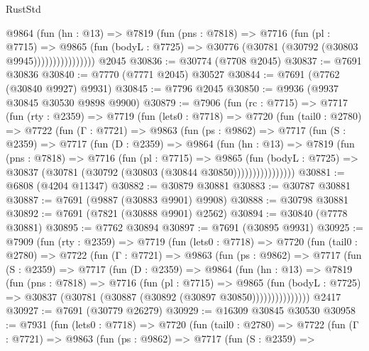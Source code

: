 \begin{lexlean}{RustStd}
\begin{coremodule}
                    @9864
                      (fun (hn : @13) =>
                      @7819
                        (fun (pns : @7818) =>
                        @7716
                          (fun (pl : @7715) =>
                          @9865
                            (fun (bodyL : @7725) =>
                            @30776 (@30781 (@30792 (@30803 @9945))))))))))))))))
    @2045
@30836 := @30774 (@7708 @2045)
@30837 := @7691 @30836
@30840 := @7770 (@7771 @2045) @30527
@30844 := @7691 (@7762 (@30840 @9927) @9931)
@30845 := @7796 @2045
@30850 := @9936 (@9937 @30845 @30530 @9898 @9900)
@30879 := @7906
    (fun (rc : @7715) =>
    @7717
      (fun (rty : @2359) =>
      @7719
        (fun (lets0 : @7718) =>
        @7720
          (fun (tail0 : @2780) =>
          @7722
            (fun (Γ : @7721) =>
            @9863
              (fun (ps : @9862) =>
              @7717
                (fun (S : @2359) =>
                @7717
                  (fun (D : @2359) =>
                  @9864
                    (fun (hn : @13) =>
                    @7819
                      (fun (pns : @7818) =>
                      @7716
                        (fun (pl : @7715) =>
                        @9865
                          (fun (bodyL : @7725) =>
                          @30837 (@30781 (@30792 (@30803 (@30844 @30850))))))))))))))))
@30881 := @6808 (@4204 @11347)
@30882 := @30879 @30881
@30883 := @30787 @30881
@30887 := @7691 (@9887 (@30883 @9901) @9908)
@30888 := @30798 @30881
@30892 := @7691 (@7821 (@30888 @9901) @2562)
@30894 := @30840 (@7778 @30881)
@30895 := @7762 @30894
@30897 := @7691 (@30895 @9931)
@30925 := @7909
    (fun (rty : @2359) =>
    @7719
      (fun (lets0 : @7718) =>
      @7720
        (fun (tail0 : @2780) =>
        @7722
          (fun (Γ : @7721) =>
          @9863
            (fun (ps : @9862) =>
            @7717
              (fun (S : @2359) =>
              @7717
                (fun (D : @2359) =>
                @9864
                  (fun (hn : @13) =>
                  @7819
                    (fun (pns : @7818) =>
                    @7716
                      (fun (pl : @7715) =>
                      @9865
                        (fun (bodyL : @7725) =>
                        @30837 (@30781 (@30887 (@30892 (@30897 @30850)))))))))))))))
    @2417
@30927 := @7691 (@30779 @26279)
@30929 := @16309 @30845 @30530
@30958 := @7931
    (fun (lets0 : @7718) =>
    @7720
      (fun (tail0 : @2780) =>
      @7722
        (fun (Γ : @7721) =>
        @9863
          (fun (ps : @9862) =>
          @7717
            (fun (S : @2359) =>

\end{coremodule}
\end{lexlean}
